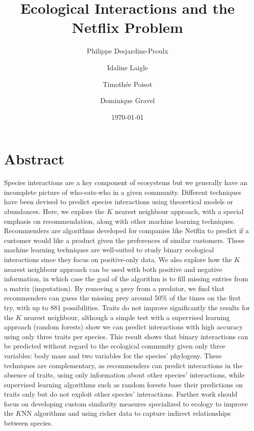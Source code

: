 \documentclass[letterpaper]{article}
\begin{document}
\title{Ecological Interactions and the Netflix Problem}
\author[0,1,2]{Philippe Desjardins-Proulx}
\author[1]{Idaline Laigle}
\author[2]{Timothée Poisot}
\author[1]{Dominique Gravel}
\date{\today}
\maketitle

\section{Abstract}

Species interactions are a key component of ecosystems but we generally have an
incomplete picture of who-eats-who in a given community. Different techniques
have been devised to predict species interactions using theoretical models or
abundances. Here, we explore the $K$ nearest neighbour approach, with a special
emphasis on recommendation, along with other machine learning techniques.
Recommenders are algorithms developed for companies like Netflix to predict if
a customer would like a product given the preferences of similar customers.
These machine learning techniques are well-suited to study binary ecological
interactions since they focus on positive-only data. We also explore how the
$K$ nearest neighbour approach can be used with both positive and negative
information, in which case the goal of the algorithm is to fill missing entries
from a matrix (imputation). By removing a prey from a predator, we find that
recommenders can guess the missing prey around 50\% of the times on the first
try, with up to 881 possibilities. Traits do not improve significantly the
results for the $K$ nearest neighbour, although a simple test with a supervised
learning approach (random forests) show we can predict interactions with high
accuracy using only three traits per species. This result shows that binary
interactions can be predicted without regard to the ecological community given
only three variables: body mass and two variables for the species' phylogeny.
These techniques are complementary, as recommenders can predict interactions in
the absence of traits, using only information about other species'
interactions, while supervised learning algorithms such as random forests base
their predictions on traits only but do not exploit other species'
interactions. Further work should focus on developing custom similarity
measures specialized to ecology to improve the $K$NN algorithms and using
richer data to capture indirect relationships between species.
\end{document}
